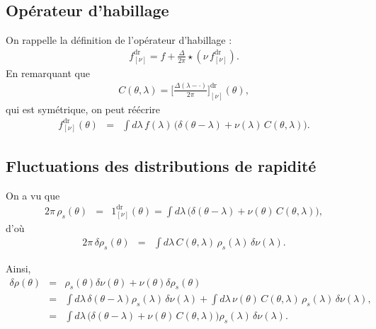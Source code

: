 \subsection{Opérateur d’habillage}

On rappelle la définition de l’opérateur d’habillage :
\begin{eqnarray}
	f^{\mathrm{dr}}_{[\nu]} = f + \frac{\Delta}{2\pi} \star ( \nu \, f^{\mathrm{dr}}_{[\nu]} ).	
\end{eqnarray}
En remarquant que 
\begin{eqnarray}
	C(\theta , \lambda) = \Bigg[ \frac{\Delta ( \lambda - \cdot ) }{2\pi } \Bigg]^{\mathrm{dr}}_{[\nu]} (\theta), 	
\end{eqnarray}
qui est symétrique, on peut réécrire~\cite{Doyon_2017}
\begin{eqnarray}
	f^{\mathrm{dr}}_{[\nu]}(\theta) 
	&=&  \int d\lambda \, f(\lambda) \,  \Big( \delta ( \theta - \lambda ) + \nu(\lambda)\, C(\theta,\lambda) \Big).
\end{eqnarray}

\subsection{Fluctuations des distributions de rapidité}

On a vu que
\begin{eqnarray}
	2\pi \, \rho_s (\theta) 
	&=& 1^{\mathrm{dr}}_{[\nu]} (\theta) 
	= \int d \lambda \, \Big( \delta ( \theta - \lambda ) + \nu(\theta)\, C(\theta,\lambda) \Big),
\end{eqnarray}
d’où
\begin{eqnarray}
	2\pi \, \delta \rho_s (\theta) 
	&=& \int d \lambda \, C(\theta,\lambda)\, \rho_s(\lambda)\, \delta \nu(\lambda).	
\end{eqnarray}

Ainsi,
\begin{eqnarray}
	\delta \rho (\theta) 
	&=& \rho_s(\theta) \delta \nu (\theta) + \nu(\theta) \delta \rho_s (\theta) \\
	&=& \int d \lambda \, \delta ( \theta - \lambda ) \rho_s(\lambda)\, \delta \nu(\lambda)  
	+ \int d \lambda \, \nu (\theta)\, C(\theta,\lambda)\,\rho_s(\lambda)\, \delta \nu (\lambda),  \\
	&=& \int d \lambda \, \Big( \delta ( \theta - \lambda ) + \nu (\theta)\, C(\theta,\lambda) \Big) \rho_s(\lambda)\, \delta \nu (\lambda). \label{annex.J.rho.2}
\end{eqnarray}

